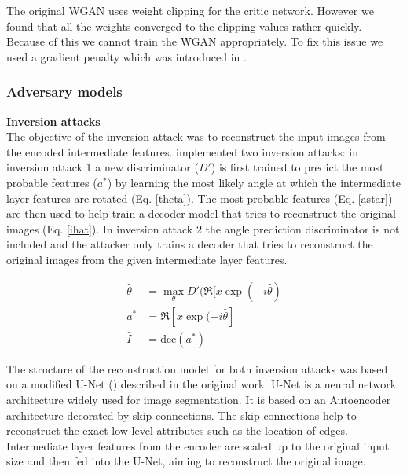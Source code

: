 The original WGAN uses weight clipping for the critic network. However we found that all the weights converged to the clipping values rather quickly. Because of this we cannot train the WGAN appropriately. To fix this issue we used a gradient penalty which was introduced in \citet{DBLP:journals/corr/GulrajaniAADC17}.

\subsubsection{Adversary models}

\textbf{Inversion attacks}\\
The objective of the inversion attack was to reconstruct the input images from the encoded intermediate features. \citet{xiang2020interpretable} implemented two inversion attacks: in inversion attack 1 a new discriminator ($D'$) is first trained to predict the most probable features ($a^*$) by learning the most likely angle at which the intermediate layer features are rotated (Eq. \ref{theta}). The most probable features (Eq. \ref{astar}) are then used to help train a decoder model that tries to reconstruct the original images (Eq. \ref{ihat}). In inversion attack 2 the angle prediction discriminator is not included and the attacker only trains a decoder that tries to reconstruct the original images from the given intermediate layer features. 

\begin{align}
    \hat{\theta} &= \max_{\theta}D'(\Re[x\exp(-i\hat{\theta}) \label{theta} \\
    a^* &= \Re[x\exp(-i\hat{\theta}] \label{astar} \\
    \hat{I} &= \text{dec}(a^*) \label{ihat}
\end{align}

The structure of the reconstruction model for both inversion attacks was based on a modified U-Net (\citet{U-net}) described in the original work. U-Net is a neural network architecture widely used for image segmentation. It is based on an Autoencoder architecture decorated by skip connections. The skip connections help to reconstruct the exact low-level attributes such as the location of edges. Intermediate layer features from the encoder are scaled up to the original input size and then fed into the U-Net, aiming to reconstruct the original image. 

